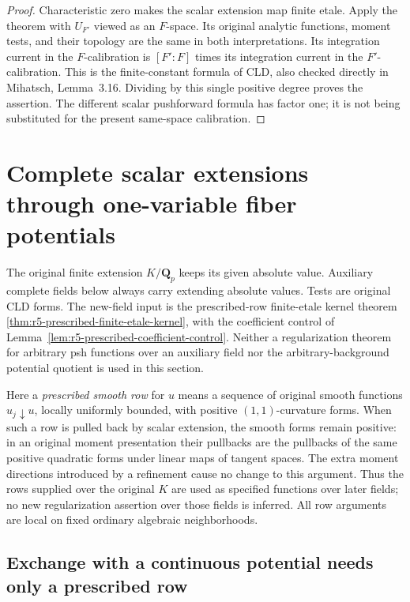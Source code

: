 \documentclass[11pt,a4paper]{article}
\numberwithin{equation}{section}
\theoremstyle{definition}
\theoremstyle{remark}
\begin{document}
\begin{proof}
Characteristic zero makes the scalar extension map finite etale.
Apply the theorem with $U_{F'}$ viewed as an $F$-space. Its
original analytic functions, moment tests, and their topology are
the same in both interpretations. Its integration current in the
$F$-calibration is $[F':F]$ times its integration current in the
$F'$-calibration. This is the finite-constant formula of CLD,
also checked directly in Mihatsch, Lemma~3.16. Dividing by this
single positive degree proves the assertion. The different scalar
pushforward formula has factor one; it is not being substituted
for the present same-space calibration.
\end{proof}



\section{Complete scalar extensions through one-variable fiber potentials}
\label{sec:r5-scalar-extension-kernel}

The original finite extension $K/\mathbf Q_p$ keeps its given absolute
value.  Auxiliary complete fields below always carry extending
absolute values.  Tests are original CLD forms.  The new-field input
is the prescribed-row finite-etale kernel theorem
\ref{thm:r5-prescribed-finite-etale-kernel}, with the coefficient
control of Lemma~\ref{lem:r5-prescribed-coefficient-control}.
Neither a regularization theorem for arbitrary psh functions over an
auxiliary field nor the arbitrary-background potential quotient is
used in this section.

Here a \emph{prescribed smooth row} for $u$ means a sequence of original
smooth functions $u_j\downarrow u$, locally uniformly bounded, with
positive $(1,1)$-curvature forms.  When such a row is pulled back by
scalar extension, the smooth forms remain positive: in an original
moment presentation their pullbacks are the pullbacks of the same
positive quadratic forms under linear maps of tangent spaces.
The extra moment directions introduced by a refinement cause no
change to this argument.  Thus the rows supplied over the original
$K$ are used as specified functions over later fields; no new
regularization assertion over those fields is inferred.  All row
arguments are local on fixed ordinary algebraic neighborhoods.

\subsection{Exchange with a continuous potential needs only a prescribed row}
\end{document}
